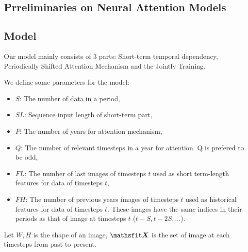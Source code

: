 \subsection{Prreliminaries on Neural Attention Models}

\subsection{Model}
Our model mainly consists of 3 parts: Short-term temporal dependency, Periodically Shifted Attention Mechanism and the Jointly Training.  

We define some parameters for the model:
\begin{itemize}
    \item $S$: The number of data in a period,
    \item $SL$: Sequence input length of short-term part,
    \item $P$: The number of years for attention mechanism,
    \item $Q$: The number of relevant timesteps in a year for attention. Q is prefered to be odd,
    \item $FL$: The number of last images of timesteps $t$ used as short term-length features for data of timesteps $t$,
    \item $FH$: The number of previous years images of timesteps $t$ used as historical features for data of timesteps $t$. These images have the same indices in their periods as that of image at timesteps $t$ ($t-S, t-2S,\dots$).
\end{itemize}
Let $W, H$ is the shape of an image, $\tX$ is the set of image at each timesteps from past to present. 

